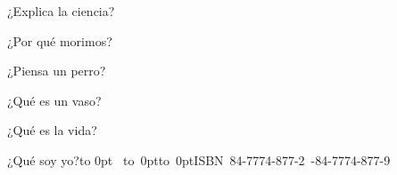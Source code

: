  ¿Explica la ciencia?\par
 ¿Por qué morimos?\par
 ¿Piensa un perro?\par
 ¿Qué es un vaso?\par
 ¿Qué es la vida?\par
 ¿Qué soy yo?\kern4.4cm\vbox to 0pt{\vss\pdfBlack
  \hbox{%
   \barheight=2.4cm 
   \vbox to 0pt{\vss\hbox to 0pt{ISBN 84-7774-877-2\hss}\kern\barheight\kern1pc}%
   -84-7774-877-9
   \relax
 }\kern1pc}\par
\endinput

